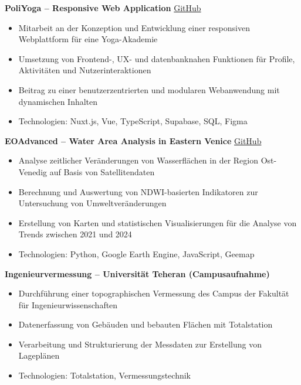 \documentclass[a4paper,10pt]{article}
\begin{document}
\vspace{0.35em}

\textbf{PoliYoga -- Responsive Web Application} \hfill \href{https://github.com/moeinp70/HYP_Yoga}{GitHub}\\
\begin{itemize}[leftmargin=1.5em, noitemsep]
    \item Mitarbeit an der Konzeption und Entwicklung einer responsiven Webplattform für eine Yoga-Akademie
    \item Umsetzung von Frontend-, UX- und datenbanknahen Funktionen für Profile, Aktivitäten und Nutzerinteraktionen
    \item Beitrag zu einer benutzerzentrierten und modularen Webanwendung mit dynamischen Inhalten
    \item Technologien: Nuxt.js, Vue, TypeScript, Supabase, SQL, Figma
\end{itemize}

\vspace{0.35em}

\textbf{EOAdvanced -- Water Area Analysis in Eastern Venice} \hfill \href{https://github.com/AmirDonyadide/EOAdvanced}{GitHub}\\
\begin{itemize}[leftmargin=1.5em, noitemsep]
    \item Analyse zeitlicher Veränderungen von Wasserflächen in der Region Ost-Venedig auf Basis von Satellitendaten
    \item Berechnung und Auswertung von NDWI-basierten Indikatoren zur Untersuchung von Umweltveränderungen
    \item Erstellung von Karten und statistischen Visualisierungen für die Analyse von Trends zwischen 2021 und 2024
    \item Technologien: Python, Google Earth Engine, JavaScript, Geemap
\end{itemize}

\vspace{0.35em}

\textbf{Ingenieurvermessung -- Universität Teheran (Campusaufnahme)}\\
\begin{itemize}[leftmargin=1.5em, noitemsep]
    \item Durchführung einer topographischen Vermessung des Campus der Fakultät für Ingenieurwissenschaften
    \item Datenerfassung von Gebäuden und bebauten Flächen mit Totalstation
    \item Verarbeitung und Strukturierung der Messdaten zur Erstellung von Lageplänen
    \item Technologien: Totalstation, Vermessungstechnik
\end{itemize}
\end{document}
